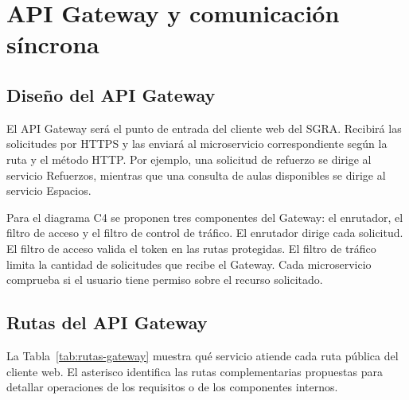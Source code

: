 \section{API Gateway y comunicación síncrona}
\subsection{Diseño del API Gateway}

El API Gateway será el punto de entrada del cliente web del SGRA.
Recibirá las solicitudes por HTTPS y las enviará al microservicio
correspondiente según la ruta y el método HTTP. Por ejemplo, una
solicitud de refuerzo se dirige al servicio Refuerzos, mientras que
una consulta de aulas disponibles se dirige al servicio Espacios.

Para el diagrama C4 se proponen tres componentes del Gateway:
el enrutador, el filtro de acceso y el filtro de control de tráfico.
El enrutador dirige cada solicitud. El filtro de acceso valida el
token en las rutas protegidas. El filtro de tráfico limita la
cantidad de solicitudes que recibe el Gateway. Cada microservicio
comprueba si el usuario tiene permiso sobre el recurso solicitado.

\subsection{Rutas del API Gateway}

La Tabla~\ref{tab:rutas-gateway} muestra qué servicio atiende cada
ruta pública del cliente web. El asterisco identifica las rutas
complementarias propuestas para detallar operaciones de los
requisitos o de los componentes internos.

